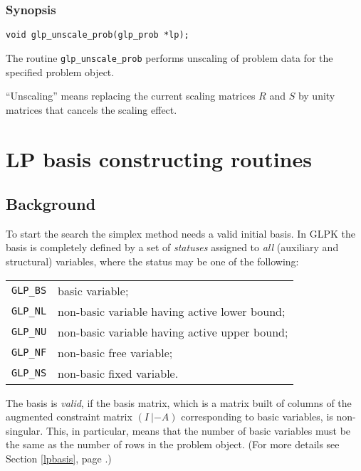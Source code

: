 \subsubsection*{Synopsis}

\begin{verbatim}
void glp_unscale_prob(glp_prob *lp);
\end{verbatim}

The routine \verb|glp_unscale_prob| performs unscaling of problem data
for the specified problem object.

``Unscaling'' means replacing the current scaling matrices $R$ and $S$
by unity matrices that cancels the scaling effect.


\newpage

\section{LP basis constructing routines}

\subsection{Background}

To start the search the simplex method needs a valid initial basis. In
GLPK the basis is completely defined by a set of {\it statuses} assigned
to {\it all} (auxiliary and structural) variables, where the status may
be one of the following:

\begin{tabular}{@{}ll}
\verb|GLP_BS| & basic variable;\\
\verb|GLP_NL| & non-basic variable having active lower bound;\\
\verb|GLP_NU| & non-basic variable having active upper bound;\\
\verb|GLP_NF| & non-basic free variable;\\
\verb|GLP_NS| & non-basic fixed variable.\\
\end{tabular}

The basis is {\it valid}, if the basis matrix, which is a matrix built
of columns of the augmented constraint matrix $(I\:|-A)$ corresponding
to basic variables, is non-singular. This, in particular, means that
the number of basic variables must be the same as the number of rows in
the problem object. (For more details see Section \ref{lpbasis}, page
\pageref{lpbasis}.)

